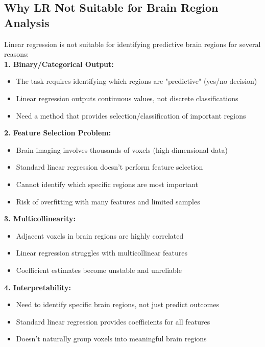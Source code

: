 \documentclass[12pt]{article}
\begin{document}
\subsection{Why LR Not Suitable for Brain Region Analysis}

Linear regression is not suitable for identifying predictive brain regions for several reasons:\\

\textbf{1. Binary/Categorical Output:}
\begin{itemize}
    \item The task requires identifying which regions are "predictive" (yes/no decision)
    \item Linear regression outputs continuous values, not discrete classifications
    \item Need a method that provides selection/classification of important regions
\end{itemize}

\textbf{2. Feature Selection Problem:}
\begin{itemize}
    \item Brain imaging involves thousands of voxels (high-dimensional data)
    \item Standard linear regression doesn't perform feature selection
    \item Cannot identify which specific regions are most important
    \item Risk of overfitting with many features and limited samples
\end{itemize}

\textbf{3. Multicollinearity:}
\begin{itemize}
    \item Adjacent voxels in brain regions are highly correlated
    \item Linear regression struggles with multicollinear features
    \item Coefficient estimates become unstable and unreliable
\end{itemize}

\textbf{4. Interpretability:}
\begin{itemize}
    \item Need to identify specific brain regions, not just predict outcomes
    \item Standard linear regression provides coefficients for all features
    \item Doesn't naturally group voxels into meaningful brain regions
\end{itemize}
\end{document}
